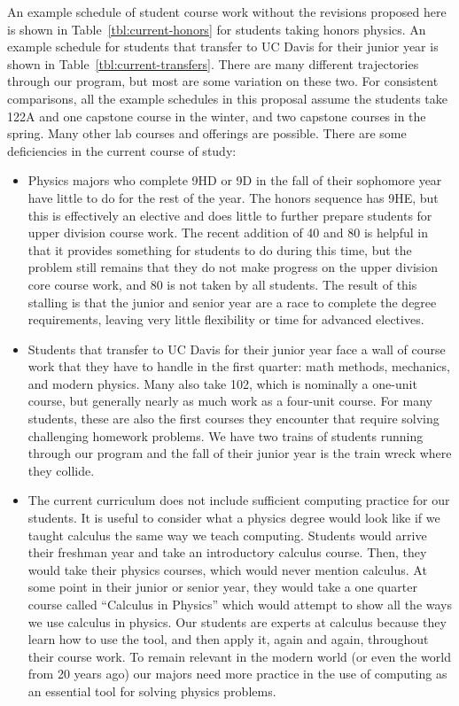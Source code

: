 \documentclass[12pt]{article}
\begin{document}
An example schedule of student course work without the revisions
proposed here is shown in Table~\ref{tbl:current-honors} for students
taking honors physics.  An example schedule for students that transfer
to UC Davis for their junior year is shown in
Table~\ref{tbl:current-transfers}.  There are many different
trajectories through our program, but most are some variation on these
two.  For consistent comparisons, all the example schedules in this
proposal assume the students take 122A and one capstone course in the
winter, and two capstone courses in the spring.  Many other lab
courses and offerings are possible. There are some deficiencies in the
current course of study:
\begin{itemize}
\item Physics majors who complete 9HD or 9D in the fall of their
  sophomore year have little to do for the rest of the year.  The
  honors sequence has 9HE, but this is effectively an elective and
  does little to further prepare students for upper division
  course work.  The recent addition of 40 and 80 is helpful in that it
  provides something for students to do during this time, but the
  problem still remains that they do not make progress on the upper
  division core course work, and 80 is not taken by all students.  The
  result of this stalling is that the junior and senior year are a
  race to complete the degree requirements, leaving very little
  flexibility or time for advanced electives.

\item Students that transfer to UC Davis for their junior year face a
  wall of course work that they have to handle in the first quarter:
  math methods, mechanics, and modern physics.  Many also take 102,
  which is nominally a one-unit course, but generally nearly as much
  work as a four-unit course.  For many students, these are also the
  first courses they encounter that require solving challenging
  homework problems.  We have two trains of students running through
  our program and the fall of their junior year is the train wreck
  where they collide.

\item The current curriculum does not include sufficient computing
  practice for our students.  It is useful to consider what a physics
  degree would look like if we taught calculus the same way we teach
  computing.  Students would arrive their freshman year and take an
  introductory calculus course.  Then, they would take their physics
  courses, which would never mention calculus.  At some point in their
  junior or senior year, they would take a one quarter course called
  ``Calculus in Physics'' which would attempt to show all the ways we
  use calculus in physics.  Our students are experts at calculus
  because they learn how to use the tool, and then apply it, again and
  again, throughout their course work.  To remain relevant in the
  modern world (or even the world from 20 years ago) our majors need
  more practice in the use of computing as an essential tool for
  solving physics problems.


\end{itemize}
\end{document}
